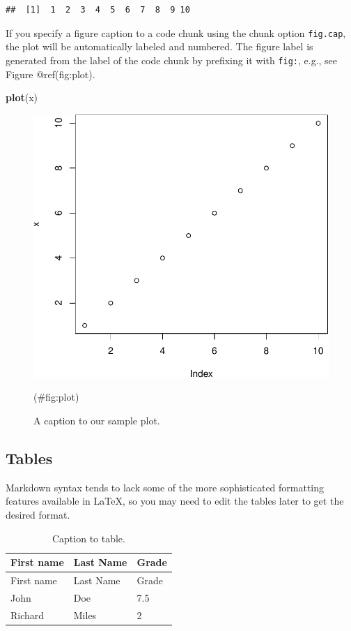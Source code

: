 \documentclass[9pt,a4paper,]{extarticle}
\newenvironment{Shaded}{\begin{snugshade}}{\end{snugshade}}
\newcommand{\FunctionTok}[1]{\textcolor[rgb]{0.13,0.29,0.53}{\textbf{#1}}}
\newcommand{\NormalTok}[1]{#1}
\begin{document}
\begin{verbatim}
##  [1]  1  2  3  4  5  6  7  8  9 10
\end{verbatim}

If you specify a figure caption to a code chunk using the chunk option \texttt{fig.cap}, the plot will be automatically labeled and numbered. The figure label is generated from the label of the code chunk by prefixing it with \texttt{fig:}, e.g., see Figure @ref(fig:plot).

\begin{Shaded}
\begin{Highlighting}[]
\FunctionTok{plot}\NormalTok{(x)}
\end{Highlighting}
\end{Shaded}

\begin{figure}

{\centering \includegraphics[width=0.6\linewidth]{RMeDPower_vignette_files/figure-latex/plot-1} 

}

\caption{A caption to our sample plot.}(\#fig:plot)
\end{figure}

\hypertarget{tables}{%
\subsection{Tables}\label{tables}}

Markdown syntax tends to lack some of the more sophisticated formatting features available in LaTeX, so you may need to edit the tables later to get the desired format.

\begin{longtable}[]{@{}lll@{}}
\caption{Caption to table.}\tabularnewline
\toprule\noalign{}
First name & Last Name & Grade \\
\midrule\noalign{}
\endfirsthead
\toprule\noalign{}
First name & Last Name & Grade \\
\midrule\noalign{}
\endhead
\bottomrule\noalign{}
\endlastfoot
John & Doe & 7.5 \\
Richard & Miles & 2 \\
\end{longtable}
\end{document}
